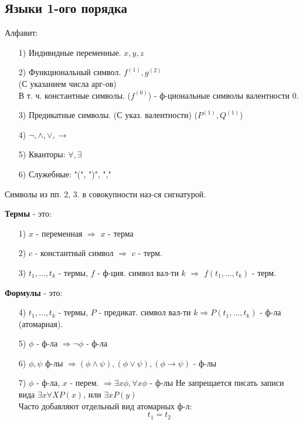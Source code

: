 \subsection{Языки 1-ого порядка}
Алфавит:
\begin{itemize}
  \item [1) ] Индивидные переменные. $x, y, z$
  \item [2) ] Функциональный символ. $f^{(1)}, g^{(2)}$\\ (С указанием числа арг-ов) \\
    В т. ч. константные символы. ($f^{(0)}$) - ф-циональные символы валентности 0.
  \item [3) ] Предикатные символы. (С указ. валентности) ($P^{(1)}, Q^{(1)}$)
  \item [4) ] $\neg, \land, \lor, \rightarrow$
  \item [5) ] Кванторы: $\forall, \exists$
  \item [6) ] Служебные: "(", ")", ","
\end{itemize}
\begin{note}
Символы из пп. 2, 3. в совокупности наз-ся сигнатурой.
\end{note}
\begin{definition}
\textbf{Термы} - это:
\begin{itemize}
  \item [1)] $x$ - переменная $\Rightarrow$ $x$ - терма
  \item [2) ] $c$ - константный символ $\Rightarrow$ $c$ - терм.
  \item [3) ] $t_1, \ldots, t_k$ - термы, $f$ - ф-ция. символ вал-ти $k$ $\Rightarrow$ $f(t_1, \ldots, t_k)$ - терм. \\
\end{itemize}
\end{definition}
\begin{definition}
\textbf{Формулы} - это:
\begin{itemize}
  \item [4) ] $t_1, \ldots, t_k$ - термы, $P$ - предикат. символ вал-ти $k \Rightarrow P(t_1, \ldots, t_k)$ - ф-ла (атомарная).
  \item [5) ] $\phi$ - ф-ла $\Rightarrow \neg\phi$ - ф-ла
  \item [6) ] $\phi, \psi$ ф-лы $\Rightarrow (\phi \land \psi), (\phi \lor \psi), (\phi \rightarrow \psi)$ - ф-лы
  \item [7) ] $\phi$ - ф-ла, $x$ - перем. $\Rightarrow \exists x \phi, \forall x \phi$ - ф-лы
    Не запрещается писать записи вида $\exists x \forall X P(x)$, или $\exists x P(y)$ \\
    Часто добавляют отдельный вид атомарных ф-л:
    \[
    t_1 = t_2
    \]
\end{itemize}
\end{definition}
